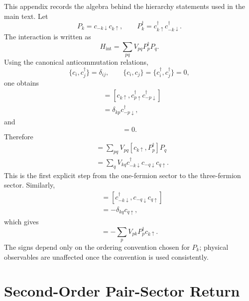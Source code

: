 \documentclass[aps,prb,reprint,superscriptaddress,nofootinbib]{revtex4-2}
\begin{document}
This appendix records the algebra behind the hierarchy statements used in the main text. Let
\begin{equation}
P_k=c_{-k\downarrow}c_{k\uparrow},\qquad
P_k^\dagger=c_{k\uparrow}^\dagger c_{-k\downarrow}^\dagger .
\end{equation}
The interaction is written as
\begin{equation}
H_{\mathrm{int}}=\sum_{pq}V_{pq}P_p^\dagger P_q .
\end{equation}
Using the canonical anticommutation relations,
\begin{equation}
\{c_{i},c_{j}^\dagger\}=\delta_{ij},\qquad
\{c_i,c_j\}=\{c_i^\dagger,c_j^\dagger\}=0,
\end{equation}
one obtains
\begin{align}
[c_{k\uparrow},P_p^\dagger]
&=[c_{k\uparrow},c_{p\uparrow}^\dagger c_{-p\downarrow}^\dagger]\nonumber\\
&=\delta_{kp}c_{-p\downarrow}^\dagger ,
\end{align}
and
\begin{equation}
[c_{k\uparrow},P_q]=0 .
\end{equation}
Therefore
\begin{align}
[c_{k\uparrow},H_{\mathrm{int}}]
&=\sum_{pq}V_{pq}[c_{k\uparrow},P_p^\dagger]P_q\nonumber\\
&=\sum_qV_{kq}c_{-k\downarrow}^\dagger c_{-q\downarrow}c_{q\uparrow}.
\end{align}
This is the first explicit step from the one-fermion sector to the three-fermion sector. Similarly,
\begin{align}
[c_{-k\downarrow}^\dagger,P_q]
&=[c_{-k\downarrow}^\dagger,c_{-q\downarrow}c_{q\uparrow}]\nonumber\\
&=-\delta_{kq}c_{q\uparrow},
\end{align}
which gives
\begin{equation}
[c_{-k\downarrow}^\dagger,H_{\mathrm{int}}]
=-\sum_pV_{pk}P_p^\dagger c_{k\uparrow}.
\end{equation}
The signs depend only on the ordering convention chosen for \(P_k\); physical observables are unaffected once the convention is used consistently.

\section{Second-Order Pair-Sector Return}
\end{document}
